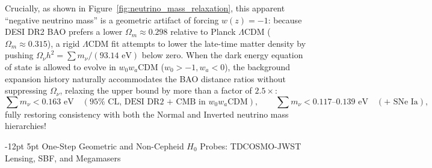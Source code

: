 \documentclass[11pt,letterpaper]{article}
\makeatletter
\renewcommand{\subsection}{\@startsection{subsection}{2}{\z@}%
  {-12pt \@plus -3pt \@minus -1pt}%
  {5pt \@plus 1pt}%
  {\normalfont\large\bfseries\color{tealaccent}}}
\makeatother
\begin{document}
Crucially, as shown in Figure~\ref{fig:neutrino_mass_relaxation}, this apparent ``negative neutrino mass'' is a geometric artifact of forcing $w(z) = -1$: because DESI DR2 BAO prefers a lower $\Omega_m \approx 0.298$ relative to Planck $\Lambda$CDM ($\Omega_m \approx 0.315$), a rigid $\Lambda$CDM fit attempts to lower the late-time matter density by pushing $\Omega_\nu h^2 = \sum m_\nu / (93.14\text{ eV})$ below zero. When the dark energy equation of state is allowed to evolve in $w_0 w_a$CDM ($w_0 > -1, w_a < 0$), the background expansion history naturally accommodates the BAO distance ratios without suppressing $\Omega_\nu$, relaxing the upper bound by more than a factor of $2.5\times$:
\begin{equation}
    \sum m_\nu < 0.163\text{ eV}\quad (95\%\text{ CL, DESI DR2 + CMB in }w_0 w_a\text{CDM}), \qquad \sum m_\nu < 0.117\text{--}0.139\text{ eV}\quad (\text{+ SNe Ia}),
    \label{eq:desi_dr2_mnu_w0wa}
\end{equation}
fully restoring consistency with both the Normal and Inverted neutrino mass hierarchies!

\subsection{One-Step Geometric and Non-Cepheid $H_0$ Probes: TDCOSMO-JWST Lensing, SBF, and Megamasers}
\end{document}

